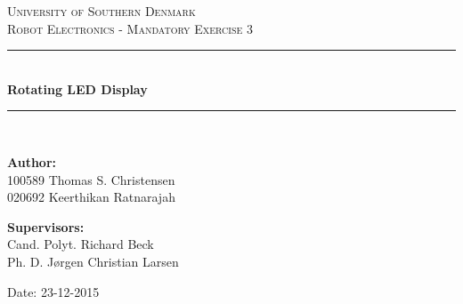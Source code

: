 \begin{titlepage}
\begin{center}

\textsc{\LARGE University of Southern Denmark}\\[1.5cm]
\textsc{\large Robot Electronics - Mandatory Exercise 3}\\[0.5cm]
\vfill
\hrule ~\\[0.3cm]
{ \huge \bfseries Rotating LED Display\\[0.4cm] }
\hrule ~\\[1.5cm]
\vfill

\begin{minipage}[t]{.49\textwidth}
\begin{flushleft} \large
\textbf{Author:}\\
100589 Thomas S. Christensen \\
020692 Keerthikan Ratnarajah\\
\end{flushleft}
\end{minipage}
\begin{minipage}[t]{.49\textwidth}
\begin{flushright} \large
\textbf{Supervisors:} \\
Cand. Polyt. Richard Beck\\
Ph. D. Jørgen Christian Larsen
\end{flushright}
\end{minipage}

\vspace{1.2cm}
Date: 23-12-2015

\end{center}
\end{titlepage}